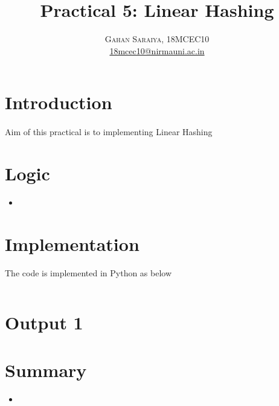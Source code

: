 \documentclass[paper=letter, fontsize=12pt]{article}
\title{\vspace{-15mm}\fontsize{24pt}{10pt}\selectfont\textbf{Practical 5: Linear Hashing}} %
\author{
\large
{\textsc{Gahan Saraiya, 18MCEC10 }}\\[2mm]
\normalsize \href{mailto:18mcec10@nirmauni.ac.in}{18mcec10@nirmauni.ac.in}\\[2mm] %
}
\date{}
\begin{document}
\maketitle %
\thispagestyle{fancy} %

\newcommand*\tick{\item[\Checkmark]}
\newcommand*\arrow{\item[$\Rightarrow$]}
\newcommand*\fail{\item[\XSolidBrush]}

\section{Introduction}
\paragraph{} Aim of this practical is to implementing Linear Hashing 

\section{Logic}
\begin{itemize}
	\item 
\end{itemize}

\section{Implementation}
The code is implemented in Python as below

\inputminted[frame=lines, breaklines, linenos]{python}{../linear_hashing.py}

\section*{Output 1}

\section{Summary}
\begin{itemize}
	\item
\end{itemize}
\end{document}
